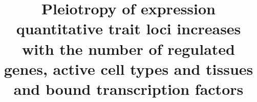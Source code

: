 \documentclass[doublespacing,linenumbers]{bmcart}
\begin{document}
    \begin{frontmatter}



            \title{Pleiotropy of expression quantitative trait loci increases with the number of regulated genes, active cell types and tissues and bound transcription factors}


            \author[
                addressref={aff1},                   %
                corref={aff1},                       %
                email={aitor.gonzalez@univ-amu.fr}   %
            ]{ }


            \address[id=aff1]{%
                ,          %
                ,                              %
            }


\end{frontmatter}
\end{document}
